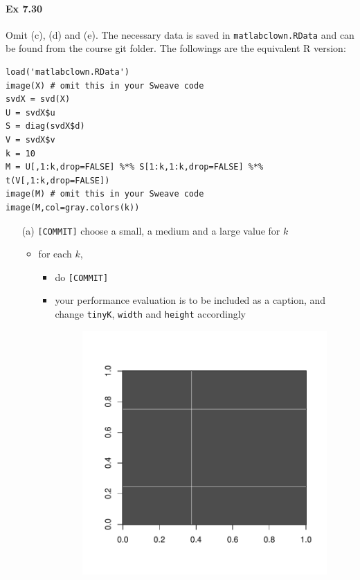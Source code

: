 \documentclass[12pt]{article}
\begin{document}
\paragraph{Ex 7.30}
Omit (c), (d) and (e). 
The necessary data is saved in \verb+matlabclown.RData+ 
and can be found from the course git folder.
The followings are the equivalent R version:
\begin{lstlisting}
load('matlabclown.RData')
image(X) # omit this in your Sweave code
svdX = svd(X)
U = svdX$u
S = diag(svdX$d)
V = svdX$v
k = 10
M = U[,1:k,drop=FALSE] %*% S[1:k,1:k,drop=FALSE] %*% t(V[,1:k,drop=FALSE])
image(M) # omit this in your Sweave code
image(M,col=gray.colors(k))
\end{lstlisting}
\begin{itemize}
    \item[(a)] \verb+[COMMIT]+ choose a small, a medium and a large value for $k$ 
         \begin{itemize}
             \item for each $k$, 
                 \begin{itemize}
             \item do \verb+[COMMIT]+ 
             \item your performance evaluation is to be included as a caption,
            and change \verb+tinyK+, \verb+width+ and \verb+height+ accordingly
\begin{figure}
    \centering
\begin{Schunk}
\end{Schunk}
\includegraphics{nhleeHW3-008}

\end{figure}
\end{itemize}
\end{itemize}
\end{itemize}
\end{document}
